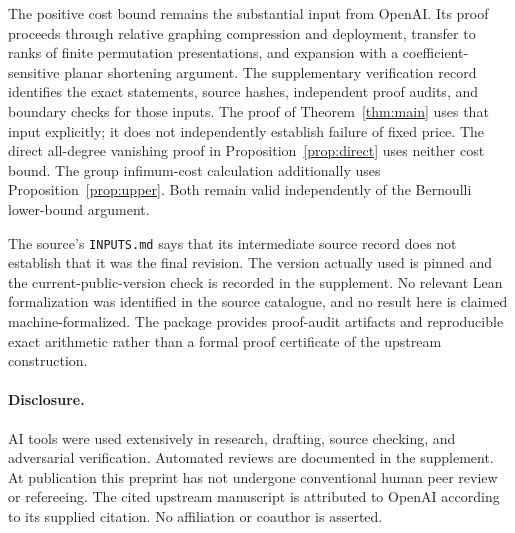 \documentclass[11pt]{article}
\theoremstyle{remark}\newtheorem{remark}[theorem]{Remark}
\begin{document}
The positive cost bound remains the substantial input from OpenAI. Its proof proceeds through relative graphing compression and deployment, transfer to ranks of finite permutation presentations, and expansion with a coefficient-sensitive planar shortening argument. The supplementary verification record identifies the exact statements, source hashes, independent proof audits, and boundary checks for those inputs. The proof of Theorem~\ref{thm:main} uses that input explicitly; it does not independently establish failure of fixed price. The direct all-degree vanishing proof in Proposition~\ref{prop:direct} uses neither cost bound. The group infimum-cost calculation additionally uses Proposition~\ref{prop:upper}. Both remain valid independently of the Bernoulli lower-bound argument.

The source's \texttt{INPUTS.md} says that its intermediate source record does not establish that it was the final revision. The version actually used is pinned and the current-public-version check is recorded in the supplement. No relevant Lean formalization was identified in the source catalogue, and no result here is claimed machine-formalized. The package provides proof-audit artifacts and reproducible exact arithmetic rather than a formal proof certificate of the upstream construction.

\paragraph{Disclosure.} AI tools were used extensively in research, drafting, source checking, and adversarial verification. Automated reviews are documented in the supplement. At publication this preprint has not undergone conventional human peer review or refereeing. The cited upstream manuscript is attributed to OpenAI according to its supplied citation. No affiliation or coauthor is asserted.
\end{document}
